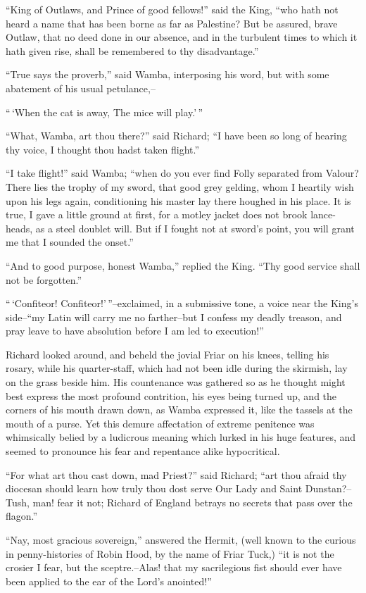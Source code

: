 ``King of Outlaws, and Prince of good fellows!'' said the King, ``who
hath not heard a name that has been borne as far as Palestine? But be
assured, brave Outlaw, that no deed done in our absence, and in the
turbulent times to which it hath given rise, shall be remembered to thy
disadvantage.''

``True says the proverb,'' said Wamba, interposing his word, but with
some abatement of his usual petulance,--

``\,`When the cat is away, The mice will play.'\,''

``What, Wamba, art thou there?'' said Richard; ``I have been so long of
hearing thy voice, I thought thou hadst taken flight.''

``I take flight!'' said Wamba; ``when do you ever find Folly separated
from Valour? There lies the trophy of my sword, that good grey gelding,
whom I heartily wish upon his legs again, conditioning his master lay
there houghed in his place. It is true, I gave a little ground at first,
for a motley jacket does not brook lance-heads, as a steel doublet will.
But if I fought not at sword's point, you will grant me that I sounded
the onset.''

``And to good purpose, honest Wamba,'' replied the King. ``Thy good
service shall not be forgotten.''

``\,`Confiteor! Confiteor!'\,''--exclaimed, in a submissive tone, a
voice near the King's side--``my Latin will carry me no farther--but I
confess my deadly treason, and pray leave to have absolution before I am
led to execution!''

Richard looked around, and beheld the jovial Friar on his knees, telling
his rosary, while his quarter-staff, which had not been idle during the
skirmish, lay on the grass beside him. His countenance was gathered so
as he thought might best express the most profound contrition, his eyes
being turned up, and the corners of his mouth drawn down, as Wamba
expressed it, like the tassels at the mouth of a purse. Yet this demure
affectation of extreme penitence was whimsically belied by a ludicrous
meaning which lurked in his huge features, and seemed to pronounce his
fear and repentance alike hypocritical.

``For what art thou cast down, mad Priest?'' said Richard; ``art thou
afraid thy diocesan should learn how truly thou dost serve Our Lady and
Saint Dunstan?--Tush, man! fear it not; Richard of England betrays no
secrets that pass over the flagon.''

``Nay, most gracious sovereign,'' answered the Hermit, (well known to
the curious in penny-histories of Robin Hood, by the name of Friar
Tuck,) ``it is not the crosier I fear, but the sceptre.--Alas! that my
sacrilegious fist should ever have been applied to the ear of the Lord's
anointed!''

